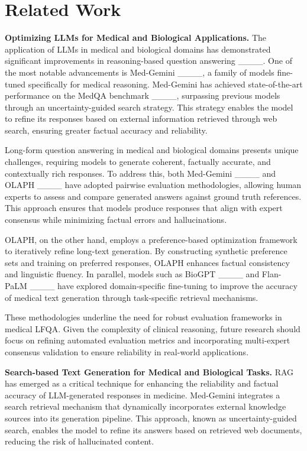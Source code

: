 \section{Related Work}
\textbf{Optimizing LLMs for Medical and Biological Applications.} The application of LLMs in medical and biological domains has demonstrated significant improvements in reasoning-based question answering ____. One of the most notable advancements is Med-Gemini ____, a family of models fine-tuned specifically for medical reasoning. Med-Gemini has achieved state-of-the-art performance on the MedQA benchmark ____, surpassing previous models through an uncertainty-guided search strategy. This strategy enables the model to refine its responses based on external information retrieved through web search, ensuring greater factual accuracy and reliability.

Long-form question answering in medical and biological domains presents unique challenges, requiring models to generate coherent, factually accurate, and contextually rich responses. To address this, both Med-Gemini ____ and OLAPH ____ have adopted pairwise evaluation methodologies, allowing human experts to assess and compare generated answers against ground truth references. This approach ensures that models produce responses that align with expert consensus while minimizing factual errors and hallucinations.

OLAPH, on the other hand, employs a preference-based optimization framework to iteratively refine long-text generation. By constructing synthetic preference sets and training on preferred responses, OLAPH enhances factual consistency and linguistic fluency. In parallel, models such as BioGPT ____ and Flan-PaLM ____ have explored domain-specific fine-tuning to improve the accuracy of medical text generation through task-specific retrieval mechanisms.

These methodologies underline the need for robust evaluation frameworks in medical LFQA. Given the complexity of clinical reasoning, future research should focus on refining automated evaluation metrics and incorporating multi-expert consensus validation to ensure reliability in real-world applications.






\textbf{Search-based Text Generation for Medical and Biological Tasks.}
RAG has emerged as a critical technique for enhancing the reliability and factual accuracy of LLM-generated responses in medicine. Med-Gemini integrates a search retrieval mechanism that dynamically incorporates external knowledge sources into its generation pipeline. This approach, known as uncertainty-guided search, enables the model to refine its answers based on retrieved web documents, reducing the risk of hallucinated content.

